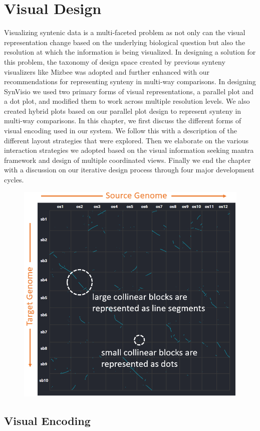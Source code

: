 \chapter{Visual Design}

Visualizing syntenic data is a multi-faceted problem as not only can the visual representation change based on the underlying biological question but also the resolution at which the information is being visualized. In designing a solution for this problem, the taxonomy of design space created by previous synteny visualizers like Mizbee \cite{Meyer2009} was adopted and further enhanced with our recommendations for representing synteny in multi-way comparisons. In designing SynVisio we used two primary forms of visual representations, a parallel plot and a dot plot, and modified them to work across multiple resolution levels. We also created hybrid plots based on our parallel plot design to represent synteny in multi-way comparisons. In this chapter, we first discuss the different forms of visual encoding used in our system. We follow this with a  description of the different layout strategies that were explored. Then we elaborate on the various interaction strategies we adopted based on the visual information seeking mantra framework and design of multiple coordinated views. Finally we end the chapter with a discussion on our iterative design process through four major development cycles.

\begin{figure}[h]
  \centering
  \includegraphics[width=.475\linewidth]{images/ch_4_dot_plot_a.PNG}
  \label{fig:ch_4_dot_plot_a}
\end{figure}


\section{Visual Encoding}

